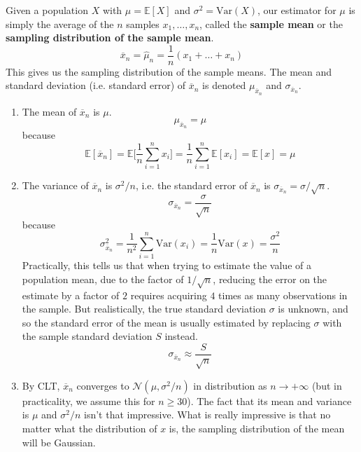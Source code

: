 \documentclass{article}
\begin{document}
    \begin{definition}
      Given a population $X$ with $\mu = \mathbb{E}[X]$ and $\sigma^2 = \mathrm{Var}(X)$, our estimator for $\mu$ is simply the average of the $n$ samples $x_1, \ldots, x_n$, called the \textbf{sample mean} or the \textbf{sampling distribution of the sample mean}. 
      \begin{equation}
        \overline{x}_n = \widehat{\mu}_n = \frac{1}{n} (x_1 + \ldots + x_n)
      \end{equation}
      This gives us the sampling distribution of the sample means. The mean and standard deviation (i.e. standard error) of $\overline{x}_n$ is denoted $\mu_{\overline{x}_n}$ and $\sigma_{\overline{x}_n}$. 
      \begin{enumerate}
        \item The mean of $\overline{x}_n$ is $\mu$. 
        \begin{equation}
          \mu_{\overline{x}_n} = \mu
        \end{equation}
        because
        \begin{equation}
          \mathbb{E}[\overline{x}_n] = \mathbb{E} \bigg[ \frac{1}{n} \sum_{i=1}^n x_i \bigg] = \frac{1}{n} \sum_{i=1}^n \mathbb{E}[x_i] = \mathbb{E}[x] = \mu
        \end{equation}
        
        \item The variance of $\overline{x}_n$ is $\sigma^2 / n$, i.e. the standard error of $\overline{x}_n$ is $\sigma_{\overline{x}_n} = \sigma / \sqrt{n}$. 
        \begin{equation}
          \sigma_{\overline{x}_n} = \frac{\sigma}{\sqrt{n}}
        \end{equation}
        because 
        \begin{equation}
          \sigma^2_{\overline{x}_n} = \frac{1}{n^2} \sum_{i=1}^n \mathrm{Var}(x_i) = \frac{1}{n} \mathrm{Var}(x) = \frac{\sigma^2}{n}
        \end{equation}
         Practically, this tells us that when trying to estimate the value of a population mean, due to the factor of $1/\sqrt{n}$, reducing the error on the estimate by a factor of $2$ requires acquiring $4$ times as many observations in the sample. But realistically, the true standard deviation $\sigma$ is unknown, and so the standard error of the mean is usually estimated by replacing $\sigma$ with the sample standard deviation $S$ instead. 
        \begin{equation}
          \sigma_{\overline{x}_n} \approx \frac{S}{\sqrt{n}}
        \end{equation}

        \item By CLT, $\overline{x}_n$ converges to $\mathcal{N}(\mu, \sigma^2/n)$ in distribution as $n \rightarrow +\infty$ (but in practicality, we assume this for $n \geq 30$). The fact that its mean and variance is $\mu$ and $\sigma^2 /n$ isn't that impressive. What is really impressive is that no matter what the distribution of $x$ is, the sampling distribution of the mean will be Gaussian. 
      \end{enumerate}
    \end{definition}
\end{document}
